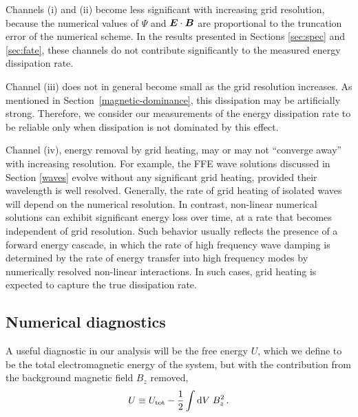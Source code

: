 Channels (i) and (ii) become less significant with increasing grid resolution, because the numerical values of $\Psi$ and $\boldsymbol{E}\cdot\boldsymbol{B}$ are proportional to the truncation error of the numerical scheme. In the results presented in Sections \ref{sec:spec} and \ref{sec:fate}, these channels do not contribute significantly to the measured energy dissipation rate.

Channel (iii) does not in general become small as the grid resolution increases. 
As mentioned in Section~\ref{magnetic-dominance}, this dissipation may be artificially strong.
Therefore, we consider our measurements of the energy dissipation rate to be reliable only when dissipation is not dominated by this effect.

Channel (iv), energy removal by grid heating, may or may not ``converge away'' with increasing resolution. For example, the FFE wave solutions discussed in Section \ref{waves} evolve without any significant grid heating, provided their wavelength is well resolved. Generally, the rate of grid heating of isolated waves will depend on the numerical resolution. In contrast, non-linear numerical solutions can exhibit significant energy loss over time, at a rate that becomes independent of grid resolution. Such behavior usually reflects the presence of a forward energy cascade, in which the rate of high frequency wave damping is determined by the rate of energy transfer into high frequency modes by numerically resolved non-linear interactions. In such cases, grid heating is expected to capture the true dissipation rate.

\subsection{Numerical diagnostics}
%
A useful diagnostic in our analysis will be the free energy $U$, which we define to be the total electromagnetic energy of the system, but with the contribution from the background magnetic field $B_z$ removed,
%
\begin{equation}
	U \equiv U_{\rm tot} - \frac{1}{2} \int \mathrm{d} V\; B_z^2 \, .
\end{equation}
%

